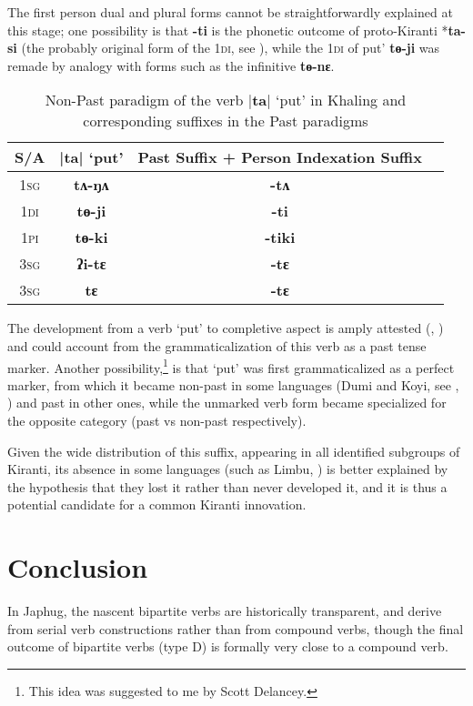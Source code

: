 \documentclass[oneside,a4paper,11pt]{article}
\newcommand{\ipa}[1]{{\phon\textbf{#1}}}
\newcommand{\dhatu}[2]{|\ipa{#1}| `#2'}
\begin{document}
 The first person dual and plural forms cannot be straightforwardly explained at this stage; one possibility is that \ipa{-ti} is the phonetic outcome of proto-Kiranti *\ipa{ta-si} (the probably original form of the \textsc{1di}, see \citealt[58]{jacques16tonogenesis}), while the \textsc{1di} of  put' \ipa{tɵ-ji} was remade by analogy with forms such as the infinitive \ipa{tɵ-nɛ}.

\begin{table}[H]
\caption{Non-Past paradigm of the verb \dhatu{ta}{put} in Khaling and corresponding suffixes in the Past paradigms} \centering \label{tab:tANA}
\begin{tabular}{cccc}
\toprule
S/A & \dhatu{ta}{put} & Past Suffix + Person Indexation Suffix \\
\midrule
\textsc{1sg} & \ipa{tʌ-ŋʌ} &  \ipa{-tʌ}  \\
\textsc{1di} & \ipa{tɵ-ji} &  \ipa{-ti}  \\
\textsc{1pi} & \ipa{tɵ-ki} & \ipa{-tiki}  \\
\textsc{3sg} & \ipa{ʔi-tɛ} & \ipa{-tɛ}  \\
\textsc{3sg} & \ipa{tɛ} & \ipa{-tɛ}  \\
\bottomrule
\end{tabular}
\end{table}


The development from a verb `put' to completive aspect is amply attested (\citealt[58]{bybee94TAM}, \citealt[248]{heine-kuteva02}) and could account from the grammaticalization of this verb as a past tense marker. Another possibility,\footnote{This idea was suggested to me by Scott Delancey.} is that `put' was first grammaticalized as a perfect marker, from which it became non-past in some languages (Dumi and Koyi, see \citealt{driem93dumi}, \citealt{lahaussois09}) and past in other ones, while the unmarked verb form became specialized for the opposite category (past vs non-past respectively).

Given the wide distribution of this suffix, appearing in all identified subgroups of Kiranti, its absence in some languages (such as Limbu, \citealt{driem87}) is better explained by the hypothesis that they lost it rather than never developed it, and it is thus a potential candidate for a common Kiranti innovation.

\section*{Conclusion}
In Japhug, the nascent bipartite verbs are historically transparent, and derive from serial verb constructions rather than from compound verbs, though the final outcome of bipartite verbs (type D) is formally very close to a compound verb.
\end{document}

